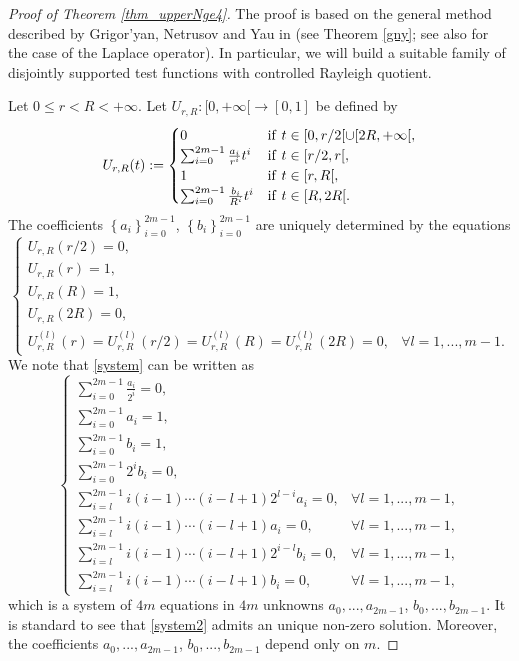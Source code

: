 \documentclass[11pt,a4paper]{amsart}
\numberwithin{equation}{section}
\begin{document}
\begin{proof}[Proof of Theorem \ref{thm_upperNge4}]
The proof is based on the general method described by Grigor'yan, Netrusov and Yau in \cite{gny} (see Theorem \ref{gny}; see also \cite{colbois_elsoufi,colbois} for the case of the Laplace operator). In particular, we will build a suitable family of disjointly supported test functions with controlled Rayleigh quotient.

Let $0\leq r<R<+\infty$. Let $U_{r,R}:[0,+\infty[\rightarrow[0,1]$ be defined by
\begin{equation}\label{radialu}
U_{r,R}(t):=\begin{cases}
0 & {\rm if\ } t\in[0,r/2[\cup[2R,+\infty[,\\
\sum_{i=0}^{2m-1}\frac{a_i}{r^i} t^i & {\rm if\ } t\in[r/2,r[,\\
1 & {\rm if\ } t\in[r,R[,\\
\sum_{i=0}^{2m-1}\frac{b_i}{R^i} t^i & {\rm if\ } t\in[R,2R[.
\end{cases}
\end{equation}
The coefficients $\left\{a_i\right\}_{i=0}^{2m-1}$, $\left\{b_i\right\}_{i=0}^{2m-1}$ are uniquely determined by the equations
\begin{equation}\label{system}
\begin{cases}
U_{r,R}(r/2)=0, & \\
U_{r,R}(r)=1, &\\
U_{r,R}(R)=1,&\\
U_{r,R}(2R)=0,&\\
U_{r,R}^{(l)}(r)=U_{r,R}^{(l)}(r/2)=U_{r,R}^{(l)}(R)=U_{r,R}^{(l)}(2R)=0,& \forall l=1,...,m-1.
\end{cases}
\end{equation}
We note that \eqref{system} can be written as
\begin{equation}\label{system2}
\begin{cases}
\sum_{i=0}^{2m-1}\frac{a_i}{2^i}=0, & \\
\sum_{i=0}^{2m-1}{a_i}=1, &\\
\sum_{i=0}^{2m-1}{b_i}=1, & \\
\sum_{i=0}^{2m-1}{2^i b_i}=0, &\\
\sum_{i=l}^{2m-1}i(i-1)\cdots(i-l+1)2^{l-i}a_i=0,& \forall l=1,...,m-1,\\
\sum_{i=l}^{2m-1}i(i-1)\cdots(i-l+1)a_i=0,& \forall l=1,...,m-1,\\
\sum_{i=l}^{2m-1}i(i-1)\cdots(i-l+1)2^{i-l}b_i=0,& \forall l=1,...,m-1,\\
\sum_{i=l}^{2m-1}i(i-1)\cdots(i-l+1)b_i=0,& \forall l=1,...,m-1,
\end{cases}
\end{equation}
which is a system of $4m$ equations in $4m$ unknowns $a_0,...,a_{2m-1}$, $b_0,...,b_{2m-1}$. It is standard to see that \eqref{system2} admits an unique non-zero solution. Moreover, the coefficients $a_0,...,a_{2m-1}$, $b_0,...,b_{2m-1}$ depend only on $m$.


\end{proof}
\end{document}
